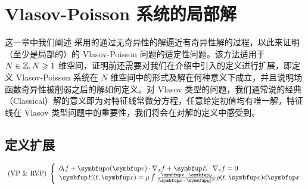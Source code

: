 
\newcommand{\rhoabs}{\hyperref[eq:rhoabs-control]{$\rho_{abs}$ 控制条件}}
\newcommand{\supremumf}{\hyperref[eq:supremum-f0-control]{$\sup f_{0}$ 控制条件}}
\newcommand{\lipxOfrho}{\hyperref[eq:lipx_rho_control]{$\operatorname{lip}_x(\rho)$ 控制条件}}
\newcommand{\lipOffVsphere}{\hyperref[eq:lip_Of_f0_in_vsphere_control]{$v$ 球内 $\operatorname{lip}(f_0)$ 控制条件}}
\newcommand{\boundcondition}{\hyperref[de:boundness]{有界条件}}



\chapter{Vlasov-Poisson 系统的局部解}

这一章中我们阐述 \cite*{HorstClasssicalI} 采用的通过无奇异性的解逼近有奇异性解的过程，以此来证明（至少是局部的）的 Vlasov-Poisson 问题的适定性问题。该方法适用于 $N\in {\mathbb{Z}}, N \geqslant 1$ 维空间，证明前还需要对我们在介绍中引入的定义进行扩展，即定义 Vlasov-Poisson 系统在 $N$ 维空间中的形式及解在何种意义下成立，并且说明场函数奇异性被削弱之后的解如何定义。对 Vlasov 类型的问题，我们通常说的经典（Classical）解的意义即为对特征线常微分方程，任意给定初值均有唯一解，特征线在 Vlasov 类型问题中的重要性，我们将会在对解的定义中感受到。



\section{定义扩展}
\begin{equation}
    \label{eq:vp_ndim}
    \text { (VP \& RVP) }\left\{\begin{array}{l}
    \partial_{t} f+\vect{a}(\vv ) \cdot \nabla_{x} f+\vE \cdot \nabla_{v} f=0 \\
    \vE(t, \vx)=\mu\int \frac{\vx - \vect{y}}{|\vx - \vect{y}|^N} \rho(t,\vx) \mathrm{d} \vx %
\end{array}\right.\end{equation}


